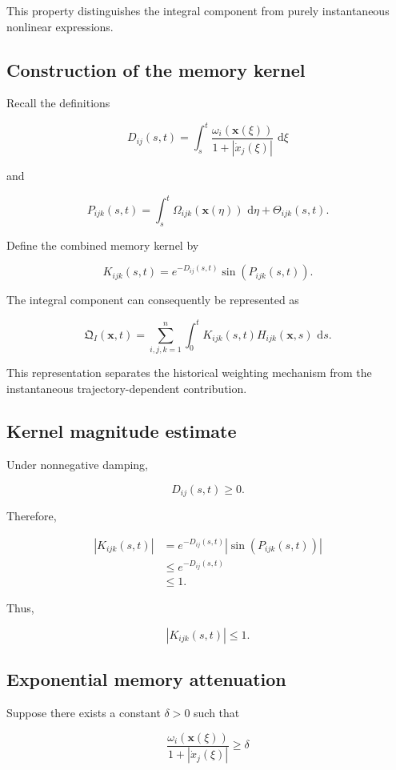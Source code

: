 \documentclass[12pt]{article}
\numberwithin{equation}{section}
\newcommand{\Q}{\mathfrak{Q}}
\newcommand{\dd}{\,\mathrm{d}}
\theoremstyle{definition}
\theoremstyle{remark}
\begin{document}
This property distinguishes the integral
component from purely instantaneous
nonlinear expressions.

\subsection{Construction of the memory kernel}

Recall the definitions

\[
D_{ij}(s,t)
=
\int_s^t
\frac{\omega_i(\mathbf{x}(\xi))}
{1+|\dot{x}_j(\xi)|}
\,\dd\xi
\]

and

\[
P_{ijk}(s,t)
=
\int_s^t
\Omega_{ijk}(\mathbf{x}(\eta))
\,\dd\eta
+
\Theta_{ijk}(s,t).
\]

Define the combined memory kernel by

\[
K_{ijk}(s,t)
=
e^{-D_{ij}(s,t)}
\sin(P_{ijk}(s,t)).
\]

The integral component can consequently
be represented as

\[
\Q_I(\mathbf{x},t)
=
\sum_{i,j,k=1}^{n}
\int_0^t
K_{ijk}(s,t)
H_{ijk}(\mathbf{x},s)
\,\dd s.
\]

This representation separates the historical
weighting mechanism from the instantaneous
trajectory-dependent contribution.

\subsection{Kernel magnitude estimate}

Under nonnegative damping,

\[
D_{ij}(s,t)\geq0.
\]

Therefore,

\[
\begin{aligned}
|K_{ijk}(s,t)|
&=
e^{-D_{ij}(s,t)}
|\sin(P_{ijk}(s,t))|
\\
&\leq e^{-D_{ij}(s,t)}
\\
&\leq1.
\end{aligned}
\]

Thus,

\[
|K_{ijk}(s,t)|\leq1.
\]

\subsection{Exponential memory attenuation}

Suppose there exists a constant
\(\delta>0\) such that

\[
\frac{\omega_i(\mathbf{x}(\xi))}
{1+|\dot{x}_j(\xi)|}
\geq\delta
\]
\end{document}
